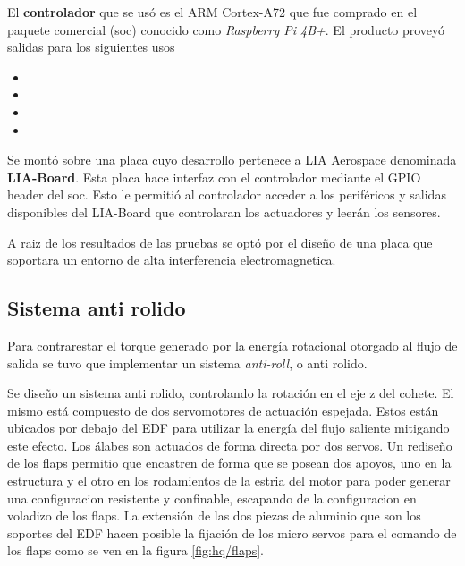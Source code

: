 \medskip

El \textbf{controlador} que se usó es el ARM Cortex-A72 que fue comprado en el paquete comercial (\gls{soc}) conocido como \textit{Raspberry Pi 4B+}. El producto proveyó salidas para los siguientes usos

\begin{itemize}
    \item {}
    \item {}
    \item {}
    \item {}
\end{itemize}

Se montó sobre una placa cuyo desarrollo pertenece a LIA Aerospace denominada \textbf{LIA-Board}. Esta placa hace interfaz con el controlador mediante el GPIO header del \gls{soc}. Esto le permitió al controlador acceder a los periféricos y salidas disponibles del LIA-Board que controlaran los actuadores y leerán los sensores.

\medskip


A raiz de los resultados de las pruebas se optó por el diseño de una placa que soportara
un entorno de alta interferencia electromagnetica. 


\subsection{Sistema anti rolido}

Para contrarestar el torque generado por la energía rotacional otorgado al flujo de salida se tuvo que implementar un sistema \textit{anti-roll}, o anti rolido.

\medskip

Se diseño un sistema anti rolido, controlando la rotación en el eje z del cohete. El mismo está compuesto de dos servomotores de actuación espejada. Estos están ubicados por debajo del EDF para utilizar la energía del flujo saliente mitigando este efecto. Los álabes son actuados de forma directa por dos servos. Un rediseño de los flaps permitio que encastren de forma que se posean dos
apoyos, uno en la estructura y el otro en los rodamientos de la estria del motor para poder generar una configuracion resistente y confinable, escapando de la configuracion en voladizo de los flaps. La extensión de las dos piezas de aluminio que son los
soportes del EDF hacen posible la fijación de los micro servos para el comando de los flaps como se ven en la figura \ref{fig:hq/flaps}.

